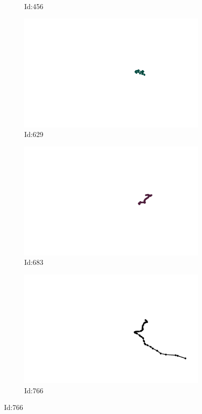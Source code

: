 \documentclass[12pt,twoside]{report}
\begin{document}
\begin{figure}
\begin{subfigure}[b]{0.20\textwidth}
\caption{Id:456}
\end{subfigure}
\begin{subfigure}[b]{0.20\textwidth}
\centering
\includegraphics[width=\textwidth]{../../trajectories/629.png}
\caption{Id:629}
\end{subfigure}
\begin{subfigure}[b]{0.20\textwidth}
\centering
\includegraphics[width=\textwidth]{../../trajectories/683.png}
\caption{Id:683}
\end{subfigure}
\begin{subfigure}[b]{0.20\textwidth}
\centering
\includegraphics[width=\textwidth]{../../trajectories/766.png}
\caption{Id:766}
\end{subfigure}
\end{figure}
\end{document}
